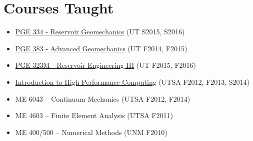\section*{Courses Taught}

  \begin{itemize}
      \item \href{http://johnfoster.pge.utexas.edu/PGE334-ResGeomechanics/}{PGE 334 - Reservoir Geomechanics} (UT S2015, S2016)
      \item \href{http://johnfoster.pge.utexas.edu/PGE383-AdvGeomechanics/}{PGE 383 - Advanced Geomechanics} (UT F2014, F2015)
      \item \href{http://johnfoster.pge.utexas.edu/PGE323M-ResEngineeringIII/}{PGE 323M - Reservoir Engineering III} (UT F2015, F2016)
      \item \href{http://johnfoster.pge.utexas.edu/HPC/}{Introduction to High-Performance Computing} (UTSA F2012, F2013, S2014)
      \item ME 6043 -- Continuum Mechanics (UTSA F2012, F2014)
      \item ME 4603 -- Finite Element Analysis (UTSA F2011)
      \item ME 400/500 -- Numerical Methods (UNM F2010)
  \end{itemize}

